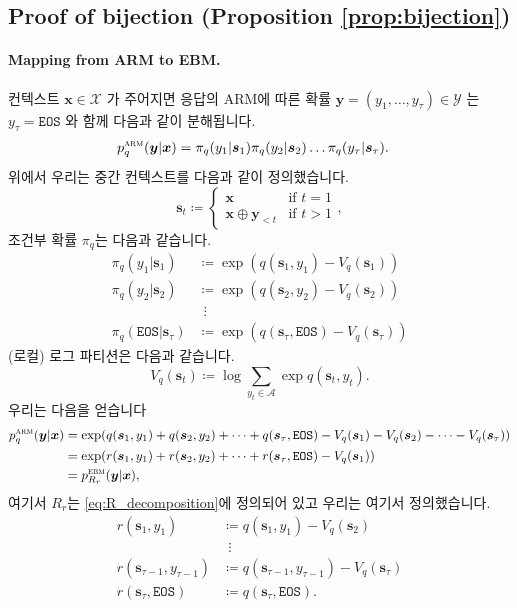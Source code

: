 \documentclass{article}
\def\s{{\bm{s}}}
\def\x{{\bm{x}}}
\def\y{{\bm{y}}}
\def\cA{{\mathcal{A}}}
\def\cX{{\mathcal{X}}}
\def\cY{{\mathcal{Y}}}
\newcommand{\Rsub}[1]{R_{#1}}
\def\arm{{\textsc{arm}}}
\def\ebm{{\textsc{ebm}}}
\def\eos{\texttt{EOS}\xspace}
\def\augvoc{\cA}
\begin{document}
\subsection{Proof of bijection (Proposition \ref{prop:bijection})} 
 \label{proof:bijection}

\paragraph{Mapping from ARM to EBM.}

컨텍스트 $\x \in \cX$ 가 주어지면 응답의 ARM에 따른 확률
 $\y = (y_1, \ldots, y_\tau) \in \cY$ 는 $y_\tau = \eos$ 와 함께 다음과 같이 분해됩니다. 
 \begin{align} 
p^ \arm _q( \y | \x )
&= \pi _q(y_1| \s _1) \pi _q(y_2| \s _2) 
 \dots \pi _q(y_{ \tau }| \s _{ \tau }).
 \end{align} 
위에서 우리는 중간 컨텍스트를 다음과 같이 정의했습니다.
 \begin{equation} 
 \s _t \coloneqq 
 \begin{cases} 
 \x & \mbox{if } t = 1 \\
 \x \oplus \y _{<t} & \mbox{if } t > 1
 \end{cases},
 \end{equation} 
조건부 확률 $\pi_q$는 다음과 같습니다.
 \begin{align} 
     \pi _{q}(y_1| \s _1) & \coloneqq \exp (q( \s _1, y_1) - V_q( \s _1)) \\
     \pi _q(y_2| \s _2) & \coloneqq \exp (q( \s _2, y_2) - V_q( \s _2)) \\
                     &~~ \vdots \\
     \pi _q( \eos | \s _{ \tau }) & \coloneqq \exp (q( \s _{ \tau }, \eos ) - V_q( \s _{ \tau })) 
 \end{align} 
(로컬) 로그 파티션은 다음과 같습니다.
 \begin{equation} 
V_q( \s _t) \coloneqq \log \sum _{y_t \in \augvoc } \exp q( \s _t, y_t).
 \end{equation} 
우리는 다음을 얻습니다
 \begin{align} 
p^ \arm _q( \y | \x )
&= \exp (q( \s _1, y_1) + q( \s _2, y_2) + \dots + q( \s _{ \tau }, \eos ) 
- V_q( \s _1) - V_q( \s _2) - \dots - V_q( \s _{ \tau }))
\\
&= \exp (r( \s _1, y_1) + r( \s _2, y_2) + \dots + r( \s _{ \tau }, \eos ) 
- V_q( \s _1)) \\
&= p^ \ebm _{ \Rsub{r} }( \y | \x ),
 \end{align} 
여기서 $\Rsub{r}$는 \eqref{eq:R_decomposition}에 정의되어 있고 우리는 여기서 정의했습니다.
 \begin{align} 
r( \s _1, y_1) & \coloneqq q( \s _1, y_1) - V_q( \s _2) \\
              &~~ \vdots \\
r( \s _{ \tau -1}, y_{ \tau -1}) & \coloneqq q( \s _{ \tau -1}, y_{ \tau -1}) - V_q( \s _{ \tau }) \\
r( \s _ \tau , \eos ) & \coloneqq q( \s _ \tau , \eos ).
 \end{align}
\end{document}
